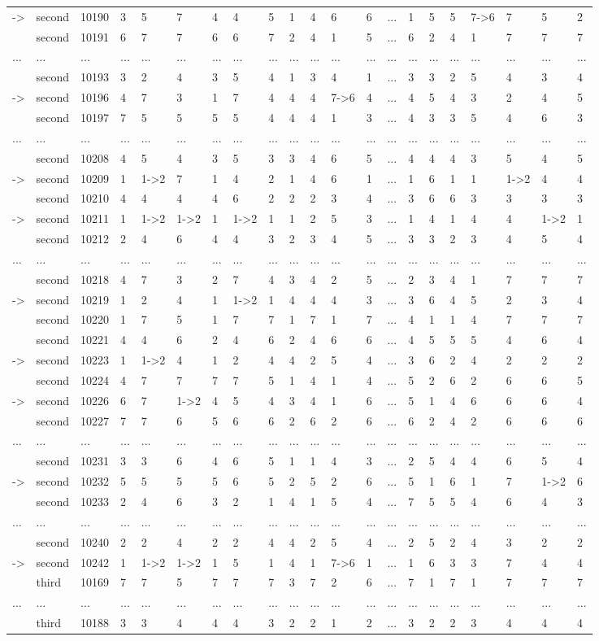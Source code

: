 \documentclass[6pt]{article}
\begin{document}
\begin{landscape}
{\begin{longtable}{lllllllllllllllllllll}
-\textgreater &second&10190&3&5&7&4&4&5&1&4&6&6&...&1&5&5&7-\textgreater 6&7&5&2\tabularnewline
&second&10191&6&7&7&6&6&7&2&4&1&5&...&6&2&4&1&7&7&7\tabularnewline
...&...&...&...&...&...&...&...&...&...&...&...&...&...&...&...&...&...&...&...&...\tabularnewline
&second&10193&3&2&4&3&5&4&1&3&4&1&...&3&3&2&5&4&3&4\tabularnewline
-\textgreater &second&10196&4&7&3&1&7&4&4&4&7-\textgreater 6&4&...&4&5&4&3&2&4&5\tabularnewline
&second&10197&7&5&5&5&5&4&4&4&1&3&...&4&3&3&5&4&6&3\tabularnewline
...&...&...&...&...&...&...&...&...&...&...&...&...&...&...&...&...&...&...&...&...\tabularnewline
&second&10208&4&5&4&3&5&3&3&4&6&5&...&4&4&4&3&5&4&5\tabularnewline
-\textgreater &second&10209&1&1-\textgreater 2&7&1&4&2&1&4&6&1&...&1&6&1&1&1-\textgreater 2&4&4\tabularnewline
&second&10210&4&4&4&4&6&2&2&2&3&4&...&3&6&6&3&3&3&3\tabularnewline
-\textgreater &second&10211&1&1-\textgreater 2&1-\textgreater 2&1&1-\textgreater 2&1&1&2&5&3&...&1&4&1&4&4&1-\textgreater 2&1\tabularnewline
&second&10212&2&4&6&4&4&3&2&3&4&5&...&3&3&2&3&4&5&4\tabularnewline
...&...&...&...&...&...&...&...&...&...&...&...&...&...&...&...&...&...&...&...&...\tabularnewline
&second&10218&4&7&3&2&7&4&3&4&2&5&...&2&3&4&1&7&7&7\tabularnewline
-\textgreater &second&10219&1&2&4&1&1-\textgreater 2&1&4&4&4&3&...&3&6&4&5&2&3&4\tabularnewline
&second&10220&1&7&5&1&7&7&1&7&1&7&...&4&1&1&4&7&7&7\tabularnewline
&second&10221&4&4&6&2&4&6&2&4&6&6&...&4&5&5&5&4&6&4\tabularnewline
-\textgreater &second&10223&1&1-\textgreater 2&4&1&2&4&4&2&5&4&...&3&6&2&4&2&2&2\tabularnewline
&second&10224&4&7&7&7&7&5&1&4&1&4&...&5&2&6&2&6&6&5\tabularnewline
-\textgreater &second&10226&6&7&1-\textgreater 2&4&5&4&3&4&1&6&...&5&1&4&6&6&6&4\tabularnewline
&second&10227&7&7&6&5&6&6&2&6&2&6&...&6&2&4&2&6&6&6\tabularnewline
...&...&...&...&...&...&...&...&...&...&...&...&...&...&...&...&...&...&...&...&...\tabularnewline
&second&10231&3&3&6&4&6&5&1&1&4&3&...&2&5&4&4&6&5&4\tabularnewline
-\textgreater &second&10232&5&5&5&5&6&5&2&5&2&6&...&5&1&6&1&7&1-\textgreater 2&6\tabularnewline
&second&10233&2&4&6&3&2&1&4&1&5&4&...&7&5&5&4&6&4&3\tabularnewline
...&...&...&...&...&...&...&...&...&...&...&...&...&...&...&...&...&...&...&...&...\tabularnewline
&second&10240&2&2&4&2&2&4&4&2&5&4&...&2&5&2&4&3&2&2\tabularnewline
-\textgreater &second&10242&1&1-\textgreater 2&1-\textgreater 2&1&5&1&4&1&7-\textgreater 6&1&...&1&6&3&3&7&4&4\tabularnewline
&third&10169&7&7&5&7&7&7&3&7&2&6&...&7&1&7&1&7&7&7\tabularnewline
...&...&...&...&...&...&...&...&...&...&...&...&...&...&...&...&...&...&...&...&...\tabularnewline
&third&10188&3&3&4&4&4&3&2&2&1&2&...&3&2&2&3&4&4&4\tabularnewline

\end{longtable}}
\end{landscape}
\end{document}
